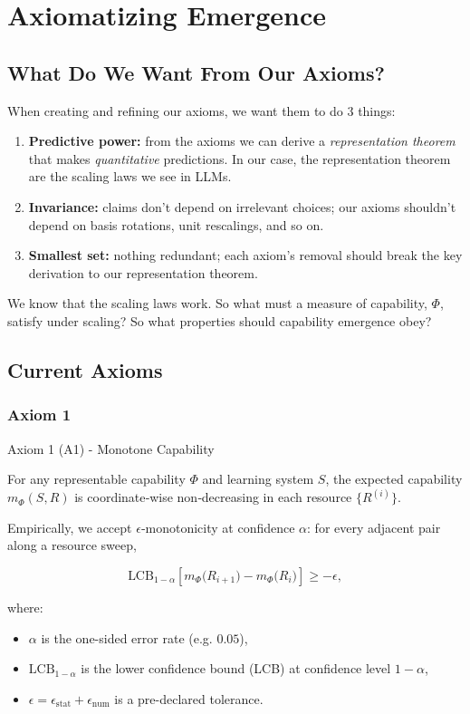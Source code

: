 \documentclass[12pt]{article}
\begin{document}
\section{Axiomatizing Emergence}

\subsection{What Do We Want From Our Axioms?}

When creating and refining our axioms, we want them to do 3 things:

\begin{enumerate}
    \item \textbf{Predictive power:} from the axioms we can derive a \textit{representation theorem} that makes \textit{quantitative} predictions. In our case, the representation theorem are the scaling laws we see in LLMs.
    \item \textbf{Invariance:} claims don’t depend on irrelevant choices; our axioms shouldn’t depend on basis rotations, unit rescalings, and so on.
    \item \textbf{Smallest set:} nothing redundant; each axiom’s removal should break the key derivation to our representation theorem.
\end{enumerate}

We know that the scaling laws work. So what must a measure of capability, $\Phi$, satisfy under scaling? So what properties should capability emergence obey?

\subsection{Current Axioms}

\subsubsection{Axiom 1}

\begin{statementbox}{Axiom 1 (A1) - Monotone Capability}

For any representable capability $\Phi$ and learning system $S$, the expected capability $m_\Phi(S,R)$ is coordinate‑wise non‑decreasing in each resource $\{R^{(i)}\}$. 

Empirically, we accept $\epsilon$‑monotonicity at confidence $\alpha$: for every adjacent pair along a resource sweep,

\[
\text{LCB}_{1-\alpha}\left[m_\Phi\bigl(R_{i+1}\bigr) - m_\Phi\bigl(R_i\bigr)\right]\ge -\epsilon,
\]

where:
\begin{itemize}
    \item $\alpha$ is the one-sided error rate (e.g. $0.05$),
    \item $\text{LCB}_{1-\alpha}$ is the lower confidence bound (LCB) at confidence level $1-\alpha$,
    \item $\epsilon=\epsilon_\text{stat}+\epsilon_\text{num}$ is a pre-declared tolerance.
\end{itemize}

\end{statementbox}
\end{document}
